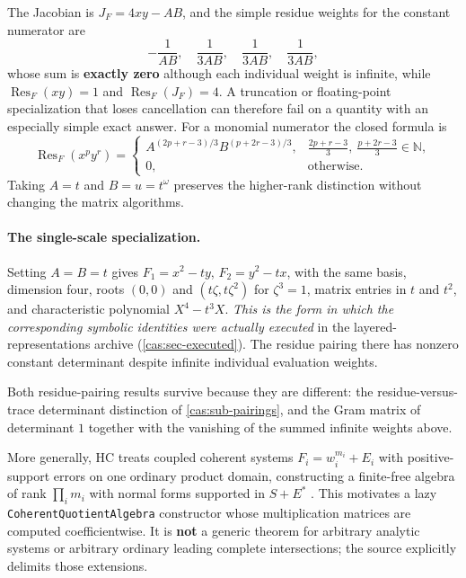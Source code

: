 \documentclass[11pt,letterpaper]{article}
\numberwithin{equation}{section}
\theoremstyle{definition}
\theoremstyle{remark}
\newcommand{\N}{\mathbb N}
\newcommand{\Res}{\operatorname{Res}}
\begin{document}
The Jacobian is $J_F=4xy-AB$, and the simple residue weights for the constant
numerator are
\[
 -\frac1{AB},\quad \frac1{3AB},\quad \frac1{3AB},\quad \frac1{3AB},
\]
whose sum is \textbf{exactly zero} although each individual weight is infinite,
while $\Res_F(xy)=1$ and $\Res_F(J_F)=4$. A truncation or floating-point
specialization that loses cancellation can therefore fail on a quantity with an
especially simple exact answer. For a monomial numerator the closed formula is
\begin{equation}\label{cas:eq-monomialresidue}
 \Res_F(x^py^r)=
 \begin{cases}
 A^{(2p+r-3)/3}B^{(p+2r-3)/3},&
 \tfrac{2p+r-3}{3},\ \tfrac{p+2r-3}{3}\in\N,\\[0.3em]
 0,&\text{otherwise.}
 \end{cases}
\end{equation}
Taking $A=t$ and $B=u=t^\omega$ preserves the higher-rank distinction without
changing the matrix algorithms.

\paragraph{The single-scale specialization.}
Setting $A=B=t$ gives $F_1=x^2-ty$, $F_2=y^2-tx$, with the same basis, dimension
four, roots $(0,0)$ and $(t\zeta,t\zeta^2)$ for $\zeta^3=1$, matrix entries in
$t$ and $t^2$, and characteristic polynomial $X^4-t^3X$. \emph{This is the form
in which the corresponding symbolic identities were actually executed} in the
layered-representations archive (\cref{cas:sec-executed}). The residue pairing
there has nonzero constant determinant despite infinite individual evaluation
weights.

Both residue-pairing results survive because they are different: the
residue-versus-trace determinant distinction of \cref{cas:sub-pairings}, and the
Gram matrix of determinant $1$ together with the vanishing of the summed
infinite weights above.

More generally, HC treats coupled coherent systems $F_i=w_i^{m_i}+E_i$ with
positive-support errors on one ordinary product domain, constructing a
finite-free algebra of rank $\prod_im_i$ with normal forms supported in $S+E^*$
\cite{cas:SourceResearch}. This motivates a lazy
\texttt{CoherentQuotientAlgebra} constructor whose multiplication matrices are
computed coefficientwise. It is \textbf{not} a generic theorem for arbitrary
analytic systems or arbitrary ordinary leading complete intersections; the
source explicitly delimits those extensions.
\end{document}
